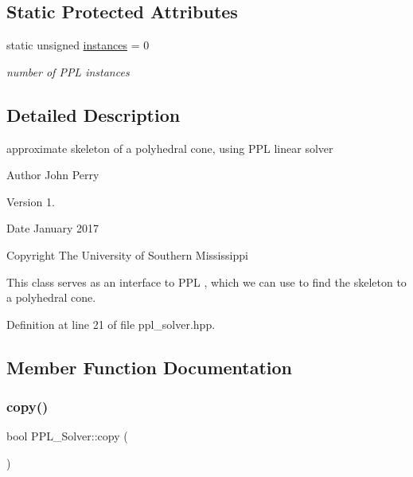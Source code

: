 \subsection*{Static Protected Attributes}
\begin{DoxyCompactItemize}
\item 
\mbox{\label{class_p_p_l___solver_a346402cddefaa715291dfb7f243073a2}} 
static unsigned \hyperlink{class_p_p_l___solver_a346402cddefaa715291dfb7f243073a2}{instances} = 0
\begin{DoxyCompactList}\small\item\em number of P\+PL instances \end{DoxyCompactList}\end{DoxyCompactItemize}


\subsection{Detailed Description}
approximate skeleton of a polyhedral cone, using P\+PL linear solver 

\begin{DoxyAuthor}{Author}
John Perry 
\end{DoxyAuthor}
\begin{DoxyVersion}{Version}
1. 
\end{DoxyVersion}
\begin{DoxyDate}{Date}
January 2017 
\end{DoxyDate}
\begin{DoxyCopyright}{Copyright}
The University of Southern Mississippi
\end{DoxyCopyright}
This class serves as an interface to P\+PL \cite{BagnaraHZ08SCP}, which we can use to find the skeleton to a polyhedral cone. 

Definition at line 21 of file ppl\+\_\+solver.\+hpp.



\subsection{Member Function Documentation}
\mbox{\label{class_p_p_l___solver_a67408174d2260de5ae5f070a70f27e9d}} 
\subsubsection{\texorpdfstring{copy()}{copy()}}
{\footnotesize\ttfamily bool P\+P\+L\+\_\+\+Solver\+::copy (\begin{DoxyParamCaption}\item[{const \hyperlink{class_l_p___solver}{L\+P\+\_\+\+Solver} $\ast$}]{ }\end{DoxyParamCaption})\hspace{0.3cm}{\ttfamily [virtual]}}



